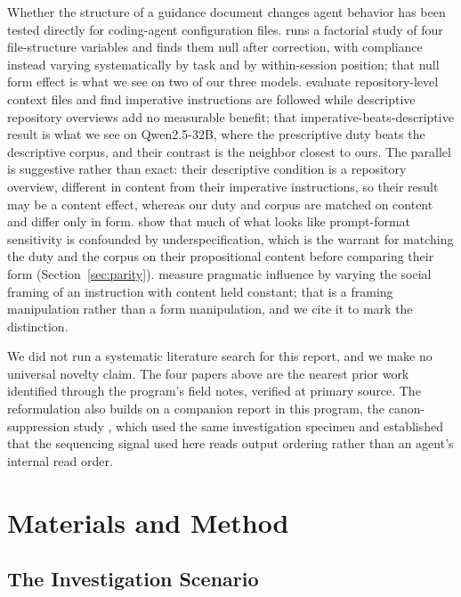 \documentclass[11pt,a4paper]{article}
\begin{document}
Whether the structure of a guidance document changes agent behavior has been tested
directly for coding-agent configuration files. \citet{mcmillan2026instruction} runs a
factorial study of four file-structure variables and finds them null after correction,
with compliance instead varying systematically by task and by within-session position;
that null form effect is what we
see on two of our three models. \citet{gloaguen2026agents} evaluate repository-level
context files and find imperative instructions are followed while descriptive repository
overviews add no measurable benefit; that imperative-beats-descriptive result is what we
see on Qwen2.5-32B, where the prescriptive duty beats the descriptive corpus, and their
contrast is the neighbor closest to ours. The parallel is suggestive rather than exact:
their descriptive condition is a repository overview, different in content from their
imperative instructions, so their result may be a content effect, whereas our duty and
corpus are matched on content and differ only in form.
\citet{pecher2026revisiting} show that much of what looks like prompt-format sensitivity
is confounded by underspecification, which is the warrant for matching the duty and the
corpus on their propositional content before comparing their form
(Section~\ref{sec:parity}). \citet{geng2026measuring} measure pragmatic influence by
varying the social framing of an instruction with content held constant; that is a
framing manipulation rather than a form manipulation, and we cite it to mark the
distinction.

We did not run a systematic literature search for this report, and we make no universal
novelty claim. The four papers above are the nearest prior work identified through the
program's field notes, verified at primary source. The reformulation also builds on a
companion report in this program, the canon-suppression study
\citep{neilson2026canon}, which used the same investigation specimen and established
that the sequencing signal used here reads output ordering rather than an agent's
internal read order.

\section{Materials and Method}

\subsection{The Investigation Scenario}
\end{document}
